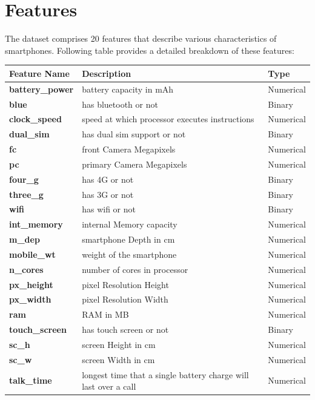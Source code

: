 \documentclass[12pt]{report}
\begin{document}
\section{Features}
The dataset comprises 20 features that describe various characteristics of smartphones. Following table provides a detailed breakdown of these features:
\begin{table}[H]
	\begin{tabular}{lll}
		\toprule
		\textbf{Feature Name}   & \textbf{Description}  & \textbf{Type}  \\
		\toprule
		\textbf{battery\_power} & battery capacity in mAh   & Numerical  \\
		\midrule
		\textbf{blue}           & has bluetooth or not  & Binary   \\
		\midrule
		\textbf{clock\_speed}   & speed at which processor executes instructions & Numerical \\
		\midrule
		\textbf{dual\_sim}      & has dual sim support or not & Binary \\
		\midrule
		\textbf{fc}             & front Camera Megapixels & Numerical \\
		\midrule
		\textbf{pc}             & primary Camera Megapixels & Numerical \\
		\midrule
		\textbf{four\_g}        & has 4G or not & Binary \\
		\midrule
		\textbf{three\_g}       & has 3G or not & Binary \\
		\midrule
		\textbf{wifi}           & has wifi or not & Binary \\
		\midrule
		\textbf{int\_memory}    & internal Memory capacity & Numerical \\
		\midrule
		\textbf{m\_dep}         & smartphone Depth in cm & Numerical \\
		\midrule
		\textbf{mobile\_wt}     & weight of the smartphone & Numerical \\
		\midrule
		\textbf{n\_cores}       & number of cores in processor & Numerical \\
		\midrule
		\textbf{px\_height}     & pixel Resolution Height & Numerical \\
		\midrule
		\textbf{px\_width}      & pixel Resolution Width & Numerical \\
		\midrule
		\textbf{ram}            & RAM in MB & Numerical \\
		\midrule
		\textbf{touch\_screen}  & has touch screen or not & Binary \\
		\midrule
		\textbf{sc\_h}          & screen Height in cm & Numerical \\
		\midrule
		\textbf{sc\_w}          & screen Width in cm & Numerical \\
		\midrule
		\textbf{talk\_time}     & longest time that a single battery charge will last over a call & Numerical \\
		\bottomrule
	\end{tabular}
\end{table}
\end{document}
